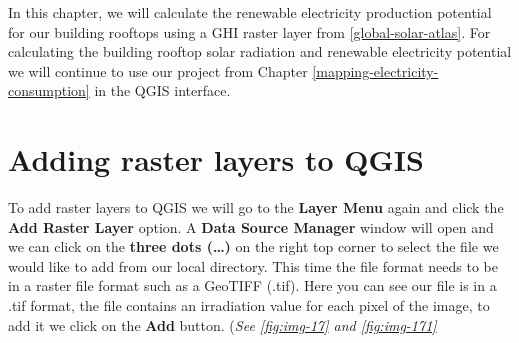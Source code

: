 \documentclass[
]{book}
\begin{document}
In this chapter, we will calculate the renewable electricity production potential for our building rooftops using a GHI raster layer from \ref{global-solar-atlas}.
For calculating the building rooftop solar radiation and renewable electricity potential we will continue to use our project from Chapter \ref{mapping-electricity-consumption} in the QGIS interface.

\hypertarget{adding-raster-layers-to-qgis}{%
\section{Adding raster layers to QGIS}\label{adding-raster-layers-to-qgis}}

To add raster layers to QGIS we will go to the \textbf{Layer Menu} again and click the \textbf{Add Raster Layer} option. A \textbf{Data Source Manager} window will open and we can click on the \textbf{three dots (\ldots)} on the right top corner to select the file we would like to add from our local directory. This time the file format needs to be in a raster file format such as a GeoTIFF (.tif). Here you can see our file is in a .tif format, the file contains an irradiation value for each pixel of the image, to add it we click on the \textbf{Add} button. (\emph{See \ref{fig:img-17} and \ref{fig:img-171}}
\end{document}
